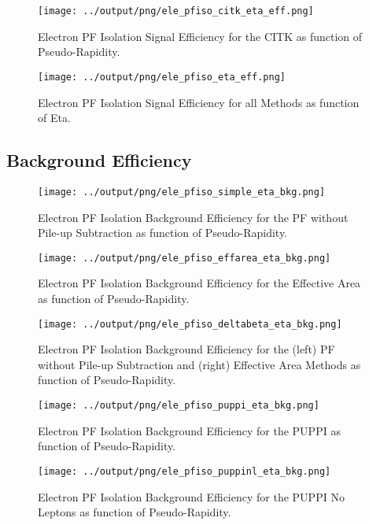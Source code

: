 \documentclass[11pt]{book}
\begin{document}
\begin{figure}[htb]
\centering
\texttt{[image: ../output/png/ele\_pfiso\_citk\_eta\_eff.png]}
\caption{Electron PF Isolation Signal Efficiency for the CITK as function of Pseudo-Rapidity.}
\label{fig:ele_pfiso_eta_eff_citk}
\end{figure}

\begin{figure}[htb]
\centering
\texttt{[image: ../output/png/ele\_pfiso\_eta\_eff.png]}
\caption{Electron PF Isolation Signal Efficiency for all Methods as function of Eta.}
\label{fig:ele_pfiso_eta_eff}
\end{figure}
\clearpage

\subsection{Background Efficiency}
\begin{figure}[htb]
\centering
\texttt{[image: ../output/png/ele\_pfiso\_simple\_eta\_bkg.png]}
\caption{Electron PF Isolation Background Efficiency for the PF without Pile-up Subtraction as function of Pseudo-Rapidity.}
\label{fig:ele_pfiso_eta_bkg_simple}
\end{figure}

\begin{figure}[htb]
\centering
\texttt{[image: ../output/png/ele\_pfiso\_effarea\_eta\_bkg.png]}
\caption{Electron PF Isolation Background Efficiency for the Effective Area as function of Pseudo-Rapidity.}
\label{fig:ele_pfiso_eta_bkg_effarea}
\end{figure}

\begin{figure}[htb]
\centering
\texttt{[image: ../output/png/ele\_pfiso\_deltabeta\_eta\_bkg.png]}
\caption{Electron PF Isolation Background Efficiency for the (left) PF without Pile-up Subtraction and (right) Effective Area Methods as function of Pseudo-Rapidity.}
\label{fig:ele_pfiso_eta_bkg_deltabeta}
\end{figure}

\begin{figure}[htb]
\centering
\texttt{[image: ../output/png/ele\_pfiso\_puppi\_eta\_bkg.png]}
\caption{Electron PF Isolation Background Efficiency for the PUPPI as function of Pseudo-Rapidity.}
\label{fig:ele_pfiso_eta_bkg_puppi}
\end{figure}

\begin{figure}[htb]
\centering
\texttt{[image: ../output/png/ele\_pfiso\_puppinl\_eta\_bkg.png]}
\caption{Electron PF Isolation Background Efficiency for the PUPPI No Leptons as function of Pseudo-Rapidity.}
\label{fig:ele_pfiso_eta_bkg_puppinl}
\end{figure}
\end{document}
